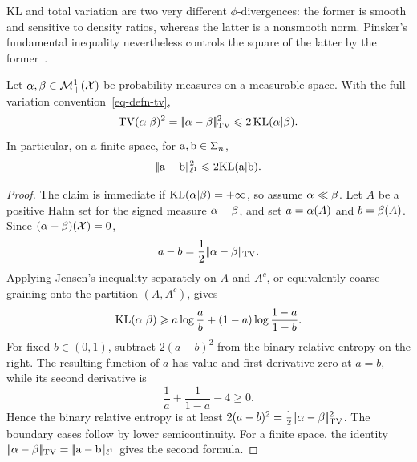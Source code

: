 KL and total variation are two very different $\phi$-divergences: the former is smooth and sensitive to density ratios, whereas the latter is a nonsmooth norm. Pinsker's fundamental inequality nevertheless controls the square of the latter by the former~\cite{pinsker1964information}.

\begin{thm}\label{thm-pinsker}
	Let $\alpha,\beta\in\mathcal{M}_+^1(\mathcal{X})$ be probability measures on a measurable space. With the full-variation convention~\eqref{eq-defn-tv},
	\[
		\operatorname{TV}(\alpha|\beta)^2
		=
		|\!| \alpha-\beta |\!|_{\operatorname{TV}}^2
		\leqslant
		2\operatorname{KL}(\alpha|\beta).
	\]
	In particular, on a finite space, for $\mathrm{a},\mathrm{b}\in\Sigma_n$,
	\[
		|\!| \mathrm{a}-\mathrm{b} |\!|_{\ell^1}^2
		\leqslant
		2\mathrm{KL}(\mathrm{a}|\mathrm{b}).
	\]
\end{thm}

\begin{proof}
	The claim is immediate if $\operatorname{KL}(\alpha|\beta)=+\infty$, so assume $\alpha\ll\beta$. Let $A$ be a positive Hahn set for the signed measure $\alpha-\beta$, and set $a=\alpha(A)$ and $b=\beta(A)$. Since $(\alpha-\beta)(\mathcal{X})=0$,
	\[
		a-b
		=
		\frac12|\!| \alpha-\beta |\!|_{\operatorname{TV}}.
	\]
	Applying Jensen's inequality separately on $A$ and $A^c$, or equivalently coarse-graining onto the partition $(A,A^c)$, gives
	\[
		\operatorname{KL}(\alpha|\beta)
		\geqslant
		a\log\frac{a}{b}
		+(1-a)\log\frac{1-a}{1-b}.
	\]
	For fixed $b\in(0,1)$, subtract $2(a-b)^2$ from the binary relative entropy on the right. The resulting function of $a$ has value and first derivative zero at $a=b$, while its second derivative is
	\[
		\frac1a+\frac1{1-a}-4\geq0.
	\]
	Hence the binary relative entropy is at least $2(a-b)^2=\frac12|\!| \alpha-\beta |\!|_{\operatorname{TV}}^2$. The boundary cases follow by lower semicontinuity. For a finite space, the identity $|\!| \alpha-\beta |\!|_{\operatorname{TV}}=|\!| \mathrm{a}-\mathrm{b} |\!|_{\ell^1}$ gives the second formula.
\end{proof}

